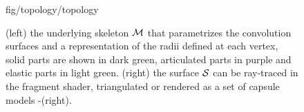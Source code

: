 \begin{figure}[h]
\centering
\begin{overpic} 
[width=\linewidth]
{fig/topology/topology}
\end{overpic}
\caption{(left) the underlying skeleton $\mathcal{M}$ that parametrizes the convolution surfaces and a representation of the radii defined at each vertex, solid parts are shown in dark green, articulated parts in purple and elastic parts in light green.
 (right) the surface $\mathcal{S}$ can be ray-traced in the fragment shader, triangulated or rendered as a set of capsule models -(right).}
\label{fig:topology}
\end{figure}